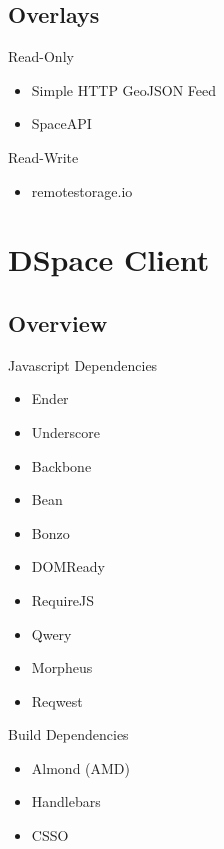 \documentclass{beamer}
\begin{document}
\subsection{Overlays}

\begin{frame}{Read-Only}
\begin{itemize}
  \item Simple HTTP GeoJSON Feed
  \item SpaceAPI
\end{itemize}
\end{frame}


\begin{frame}{Read-Write}
\begin{itemize}
  \item remotestorage.io
\end{itemize}
\end{frame}




\section{DSpace Client}
\subsection{Overview}


\begin{frame}{Javascript Dependencies}{}

  \begin{itemize}
    \item Ender
    \item Underscore
    \item Backbone
    \item Bean
    \item Bonzo
    \item DOMReady
    \item RequireJS
    \item Qwery
    \item Morpheus
    \item Reqwest
  \end{itemize}

\end{frame}


\begin{frame}{Build Dependencies}{}

  \begin{itemize}
    \item Almond (AMD)
    \item Handlebars
    \item CSSO
  \end{itemize}

\end{frame}
\end{document}

